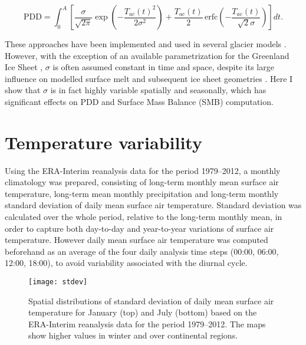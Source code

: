 \documentclass[review]{igs}
\begin{document}
\begin{equation} \label{eq:calovgreve}
  \mathrm{PDD} = \int_{0}^{A} \left[
    \frac{\sigma}{\sqrt{2\pi}}
    \exp\left({-\frac{T_{ac}(t)^2}{2\sigma^2}}\right)
    +\frac{T_{ac}(t)}{2} \,
    \mathrm{erfc} \left(-\frac{T_{ac}(t)}{\sqrt{2}\sigma}\right)
  \right]dt.
\end{equation}

These approaches have been implemented and used in several glacier models \citep[e.g.][]{letreguilly-etal-1991,greve-1997,huybrechts-dewolde-1999,seddik-etal-2012,charbit-etal-2013}. However, with the exception of an available parametrization for the Greenland Ice Sheet \citep{fausto-etal-2011}, $\sigma$ is often assumed constant in time and space, despite its large influence on modelled surface melt and subsequent ice sheet geometries \citep{charbit-etal-2013}. Here I show that $\sigma$ is in fact highly variable spatially and seasonally, which has significant effects on PDD and Surface Mass Balance (SMB) computation.


\section{Temperature variability}

Using the ERA-Interim reanalysis data \citep{data:erai} for the period 1979--2012, a monthly climatology was prepared, consisting of long-term monthly mean surface air temperature, long-term mean monthly precipitation and long-term monthly standard deviation of daily mean surface air temperature. Standard deviation was calculated over the whole period, relative to the long-term monthly mean, in order to capture both day-to-day and year-to-year variations of surface air temperature. However daily mean surface air temperature was computed beforehand as an average of the four daily analysis time steps (00:00, 06:00, 12:00, 18:00), to avoid variability associated with the diurnal cycle.

\begin{figure}
  \centering\texttt{[image: stdev]}
  \caption{Spatial distributions of standard deviation of daily mean surface air temperature for January (top) and July (bottom) based on the ERA-Interim reanalysis \citep{data:erai} data for the period 1979--2012. The maps show higher values in winter and over continental regions.}
  \label{fig:stdev}
\end{figure}
\end{document}
